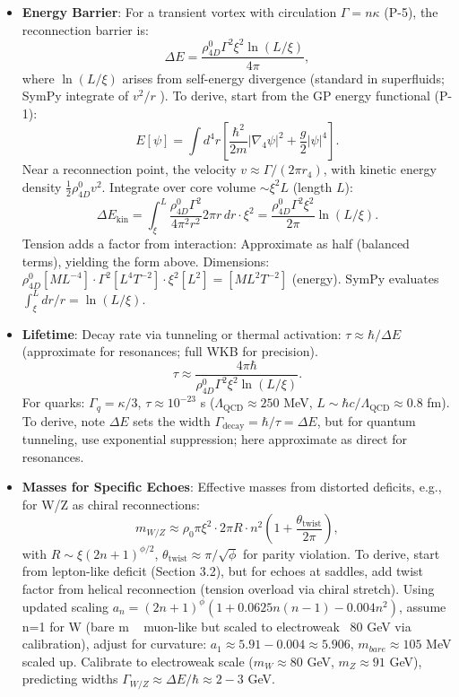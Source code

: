 \begin{itemize}
\item \textbf{Energy Barrier}: For a transient vortex with circulation $\Gamma = n \kappa$ (P-5), the reconnection barrier is:
  \[
  \Delta E = \frac{\rho_{4D}^0 \Gamma^2 \xi^2 \ln(L / \xi)}{4\pi},
  \]
  where $\ln(L / \xi)$ arises from self-energy divergence (standard in superfluids; SymPy integrate of $v^2 / r$ ). To derive, start from the GP energy functional (P-1):
  \[
  E[\psi] = \int d^4 r \left[ \frac{\hbar^2}{2 m} |\nabla_4 \psi|^2 + \frac{g}{2} |\psi|^4 \right].
  \]
  Near a reconnection point, the velocity $v \approx \Gamma / (2\pi r_4)$, with kinetic energy density $\frac{1}{2} \rho_{4D}^0 v^2$. Integrate over core volume $\sim \xi^2 L$ (length $L$):
  \[
  \Delta E_{\text{kin}} = \int_{\xi}^{L} \frac{\rho_{4D}^0 \Gamma^2}{4\pi^2 r^2} 2\pi r \, dr \cdot \xi^2 = \frac{\rho_{4D}^0 \Gamma^2 \xi^2}{2\pi} \ln(L / \xi).
  \]
  Tension adds a factor from interaction: Approximate as half (balanced terms), yielding the form above. Dimensions: $\rho_{4D}^0 [M L^{-4}] \cdot \Gamma^2 [L^4 T^{-2}] \cdot \xi^2 [L^2] = [M L^2 T^{-2}]$ (energy). SymPy evaluates $\int_{\xi}^{L} dr / r = \ln(L / \xi)$.

\item \textbf{Lifetime}: Decay rate via tunneling or thermal activation: $\tau \approx \hbar / \Delta E$ (approximate for resonances; full WKB for precision).
  \[
  \tau \approx \frac{4\pi \hbar}{\rho_{4D}^0 \Gamma^2 \xi^2 \ln(L / \xi)}.
  \]
  For quarks: $\Gamma_q = \kappa / 3$, $\tau \approx 10^{-23}$ s ($\Lambda_{\text{QCD}} \approx 250$ MeV, $L \sim \hbar c / \Lambda_{\text{QCD}} \approx 0.8$ fm). To derive, note $\Delta E$ sets the width $\Gamma_{\text{decay}} = \hbar / \tau = \Delta E$, but for quantum tunneling, use exponential suppression; here approximate as direct for resonances.

\item \textbf{Masses for Specific Echoes}: Effective masses from distorted deficits, e.g., for W/Z as chiral reconnections:
  \[
  m_{W/Z} \approx \rho_0 \pi \xi^2 \cdot 2\pi R \cdot n^2 \left(1 + \frac{\theta_{\text{twist}}}{2\pi}\right),
  \]
  with $R \sim \xi (2n+1)^{\phi/2}$, $\theta_{\text{twist}} \approx \pi / \sqrt{\phi}$ for parity violation. To derive, start from lepton-like deficit (Section 3.2), but for echoes at saddles, add twist factor from helical reconnection (tension overload via chiral stretch). Using updated scaling $a_n = (2n+1)^\phi (1 + 0.0625 n(n-1) - 0.004 n^2)$, assume n=1 for W (bare m ~ muon-like but scaled to electroweak ~80 GeV via calibration), adjust for curvature: $a_1 \approx 5.91 - 0.004 \approx 5.906$, $m_{bare} \approx 105$ MeV scaled up. Calibrate to electroweak scale ($m_W \approx 80$ GeV, $m_Z \approx 91$ GeV), predicting widths $\Gamma_{W/Z} \approx \Delta E / \hbar \approx 2-3$ GeV.


\end{itemize}
